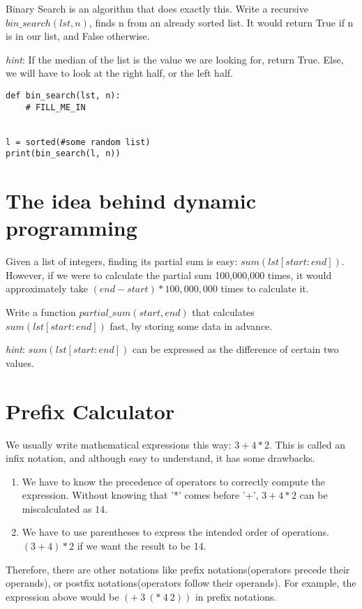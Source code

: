 \documentclass{article}
\begin{document}
Binary Search is an algorithm that does exactly this. Write a recursive
$bin\_search(lst, n)$, finds n from an already sorted list.
It would return True if n is in our list, and False
otherwise.

\textit{hint}: If the median of the list is the value we are looking for, return True.
Else, we will have to look at the right half, or the left half.

\begin{lstlisting}
def bin_search(lst, n):
    # FILL_ME_IN


l = sorted(#some random list)
print(bin_search(l, n))
\end{lstlisting}

\section{The idea behind dynamic programming}
Given a list of integers, finding its partial sum is
easy: $sum(lst[start:end])$. However, if we were to calculate the partial sum
100,000,000 times, it would approximately take $(end-start) * 100,000,000$
times to calculate it.

Write a function $partial\_sum(start, end)$ that calculates
$sum(lst[start:end])$ fast, by storing some data in advance.

\textit{hint}: $sum(lst[start:end])$ can be expressed as the difference of
certain two values.


\section{Prefix Calculator}
We usually write mathematical expressions this way:
$3+4*2$. This is called an infix notation, and although easy to understand, it has
some drawbacks.
\begin{enumerate}
  \item We have to know the precedence of operators to correctly compute the
    expression. Without knowing that '*' comes before '+', $3+4*2$ can be
    miscalculated as $14$.
  \item We have to use parentheses to express the intended order of operations.
    $(3+4)*2$ if we want the result to be 14.
\end{enumerate}
Therefore, there are other notations like prefix notations(operators precede
their operands), or postfix notations(operators follow their operands).
For example, the expression above would be $(+\ 3\ (*\ 4\
2))$ in prefix notations.
\end{document}

